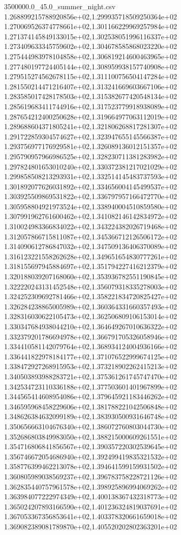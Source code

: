 \begin{filecontents*}{3500000.0_45.0_summer_night.csv}
1.268899215788920856e+02,1.299935718509250364e+02
1.270069526374778661e+02,1.301166229969257984e+02
1.271374145849133015e+02,1.302538051996116337e+02
1.273409633345759602e+02,1.304678585868023220e+02
1.275444983978104858e+02,1.306819214600463965e+02
1.277480197724405144e+02,1.308959938157740908e+02
1.279515274562678115e+02,1.311100756504147284e+02
1.281550214471216407e+02,1.313241669603667106e+02
1.283585017428178503e+02,1.315382677420548134e+02
1.285619683411744916e+02,1.317523779918938089e+02
1.287654212400250628e+02,1.319664977063112019e+02
1.289688604371805241e+02,1.321806268817281307e+02
1.291722859304574627e+02,1.323947655145566387e+02
1.293756977176929581e+02,1.326089136012151357e+02
1.295790957966986525e+02,1.328230711381283982e+02
1.297824801653010240e+02,1.330372381217021029e+02
1.299858508213293931e+02,1.332514145483737593e+02
1.301892077626031892e+02,1.334656004145499537e+02
1.303925509869531822e+02,1.336797957166472770e+02
1.305958804921973524e+02,1.338940004510859580e+02
1.307991962761600462e+02,1.341082146142834972e+02
1.310024983366834022e+02,1.343224382026719468e+02
1.312057866715811087e+02,1.345366712126506172e+02
1.314090612786847032e+02,1.347509136406370089e+02
1.316123221558262628e+02,1.349651654830777261e+02
1.318155697945884697e+02,1.351794227416212379e+02
1.320188039207168060e+02,1.353936782551190845e+02
1.322220243131452548e+02,1.356079318335278003e+02
1.324252309692781466e+02,1.358221834720825427e+02
1.326284238865005989e+02,1.360364331660357493e+02
1.328316030622105473e+02,1.362506809106153014e+02
1.330347684938044210e+02,1.364649267010636322e+02
1.332379201786694978e+02,1.366791705326058946e+02
1.334410581142079764e+02,1.368934124004936166e+02
1.336441822978184177e+02,1.371076522999674125e+02
1.338472927268915953e+02,1.373218902262415213e+02
1.340503893988283721e+02,1.375361261745747470e+02
1.342534723110336188e+02,1.377503601401967899e+02
1.344565414608954086e+02,1.379645921183446262e+02
1.346595968458229606e+02,1.381788221042506848e+02
1.348626384632099189e+02,1.383930500931646748e+02
1.350656663104676340e+02,1.386072760803044730e+02
1.352686803849983050e+02,1.388215000609261551e+02
1.354716806841856567e+02,1.390357220302539645e+02
1.356746672054686940e+02,1.392499419835321532e+02
1.358776399462213078e+02,1.394641599159931502e+02
1.360805989038569237e+02,1.396783758228721126e+02
1.362835440757961578e+02,1.398925896994069262e+02
1.363984077222974349e+02,1.400138367432318773e+02
1.365024207893166590e+02,1.401236324819037691e+02
1.367053367356853641e+02,1.403378320661659018e+02
1.369082389081789870e+02,1.405520202802363201e+02

\end{filecontents*}
